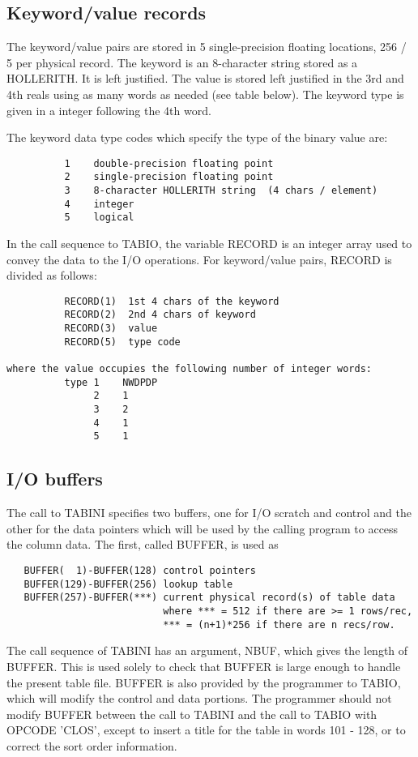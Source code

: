 \subsection{Keyword/value records }
The keyword/value pairs are stored in 5
single-precision floating locations, 256 / 5 per physical record.  The
keyword is an 8-character string stored as a HOLLERITH.  It is
left justified.  The value is stored left justified in the 3rd and 4th
reals using as many words as needed (see table below).  The keyword
type is given in a integer following the 4th word.

The keyword data type codes which specify the type of the binary value
are:
\begin{verbatim}
          1    double-precision floating point
          2    single-precision floating point
          3    8-character HOLLERITH string  (4 chars / element)
          4    integer
          5    logical
\end{verbatim}
In the call sequence to TABIO, the variable RECORD is an integer array
used to convey the data to the I/O operations.  For keyword/value
pairs, RECORD is divided as follows:
\begin{verbatim}
          RECORD(1)  1st 4 chars of the keyword
          RECORD(2)  2nd 4 chars of keyword
          RECORD(3)  value
          RECORD(5)  type code

where the value occupies the following number of integer words:
          type 1    NWDPDP
               2    1
               3    2
               4    1
               5    1

\end{verbatim}
\subsection{I/O buffers }

The call to TABINI specifies two buffers, one for I/O scratch and
control and the other for the data pointers which will be used by the
calling program to access the column data.  The first, called BUFFER,
is used as
\begin{verbatim}
   BUFFER(  1)-BUFFER(128) control pointers
   BUFFER(129)-BUFFER(256) lookup table
   BUFFER(257)-BUFFER(***) current physical record(s) of table data
                           where *** = 512 if there are >= 1 rows/rec,
                           *** = (n+1)*256 if there are n recs/row.
\end{verbatim}
The call sequence of TABINI has an argument, NBUF, which gives the
length of BUFFER.  This is used solely to check that BUFFER is large
enough to handle the present table file.  BUFFER is also provided by
the programmer to TABIO, which will modify the control and data
portions.  The programmer should not modify BUFFER between the call to
TABINI and the call to TABIO with OPCODE 'CLOS', except to insert a
title for the table in words 101 - 128, or to correct the sort order
information.

